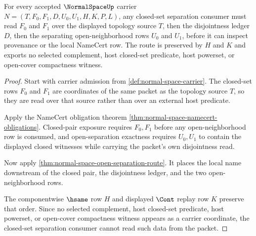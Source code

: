 \begin{theorem}
\label{thm:normalspace-closed-set-separation-route}
For every accepted $\NormalSpaceUp$ carrier $N=(T,F_0,F_1,D,U_0,U_1,H,K,P,L)$, any closed-set separation consumer must read $F_0$ and $F_1$ over the displayed topology source $T$, then the disjointness ledger $D$, then the separating open-neighborhood rows $U_0$ and $U_1$, before it can inspect provenance or the local NameCert row. The route is preserved by $H$ and $K$ and exports no selected complement, host closed-set predicate, host powerset, or open-cover compactness witness.
\end{theorem}
\begin{proof}
Start with carrier admission from \autoref{def:normal-space-carrier}. The closed-set rows $F_0$ and $F_1$ are coordinates of the same packet as the topology source $T$, so they are read over that source rather than over an external host predicate.

Apply the NameCert obligation theorem \autoref{thm:normal-space-namecert-obligations}. Closed-pair exposure requires $F_0,F_1$ before any open-neighborhood row is consumed, and open-separation exactness requires $U_0,U_1$ to contain the displayed closed witnesses while carrying the packet's own disjointness read.

Now apply \autoref{thm:normal-space-open-separation-route}. It places the local name downstream of the closed pair, the disjointness ledger, and the two open-neighborhood rows.

The componentwise $\hsame$ row $H$ and displayed $\Cont$ replay row $K$ preserve that order. Since no selected complement, host closed-set predicate, host powerset, or open-cover compactness witness appears as a carrier coordinate, the closed-set separation consumer cannot read such data from the packet.
\end{proof}


